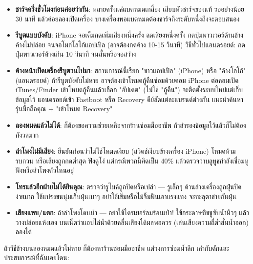 \begin{itemize}
  \item \textbf{ชาร์จครึ่งชั่วโมงก่อนค่อยว่ากัน}: หลายครั้งแค่แบตหมดเกลี้ยง เสียบหัวชาร์จของแท้ รออย่างน้อย 30 นาที แล้วค่อยลองเปิดเครื่อง บางเครื่องพอแบตหมดต้องชาร์จถึงระดับหนึ่งถึงจะตอบสนอง
  \item \textbf{รีบูตแบบบังคับ}: iPhone จอเต็มกดเพิ่มเสียงหนึ่งครั้ง ลดเสียงหนึ่งครั้ง กดปุ่มพาวเวอร์ด้านข้างค้างไม่ปล่อย จนจอโผล่โลโก้แอปเปิล (อาจต้องกดค้าง 10-15 วินาที) วิธีทั่วไปแอนดรอยด์: กดปุ่มพาวเวอร์ค้างเกิน 10 วินาที จนสั่นหรือจอสว่าง
  \item \textbf{ค้างหน้าเปิดเครื่องรีบูตวนไปมา}: สถานการณ์นี้เรียก "ขาวแอปเปิล" (iPhone) หรือ "ค้างโลโก้" (แอนดรอยด์) ถ้ารีบูตบังคับไม่หาย อาจต้องเข้าโหมดกู้คืนซ่อมด้วยคอม iPhone ต่อคอมเปิด iTunes/Finder เข้าโหมดกู้คืนแล้วเลือก "อัปเดต" (ไม่ใช่ "กู้คืน") จะติดตั้งระบบใหม่แต่เก็บข้อมูลไว้ แอนดรอยด์เข้า Fastboot หรือ Recovery คีย์ลัดแต่ละแบรนด์ต่างกัน แนะนำค้นหารุ่นมือถือคุณ + "เข้าโหมด Recovery"
  \item \textbf{ลองหมดแล้วไม่ได้}: ก็ต้องขอความช่วยเหลือจากร้านซ่อมมืออาชีพ ถ้าสำรองข้อมูลไว้แล้วก็ไม่ต้องกังวลมาก
\end{itemize}


\begin{itemize}
  \item \textbf{ลำโพงไม่มีเสียง}: ยืนยันก่อนว่าไม่ใช่โหมดเงียบ (สวิตช์เงียบข้างเครื่อง iPhone) โหมดห้ามรบกวน หรือเสียงถูกกดต่ำสุด ฟังดูโง่ แต่กรณีพวกนี้คิดเป็น 40\% แล้วตรวจว่าบลูทูธกำลังเชื่อมหูฟังหรือลำโพงตัวไหนอยู่
  \item \textbf{โทรแล้วอีกฝ่ายไม่ได้ยินคุณ}: ตรวจว่ารูไมค์ถูกปิดหรือเปล่า — รูเล็กๆ ด้านล่างเครื่องถูกฝุ่นปิดง่ายมาก ใช้แปรงขนนุ่มเก็บฝุ่นเบาๆ อย่าใช้เข็มหรือไม้จิ้มฟันเอาแรงแทง จะทะลุตาข่ายกันฝุ่น
  \item \textbf{เสียงแหบ/แตก}: ถ้าลำโพงโดนน้ำ — อย่าใช้ไดรเยอร์ลมร้อนเป่า! ใช้กระดาษทิชชูซับน้ำผิวๆ แล้ววางปล่อยแห้งเอง บนเน็ตว่าแอปไล่น้ำด้วยคลื่นเสียงได้ผลพอควร (เล่นเสียงความถี่ต่ำสั่นน้ำออก) ลองได้
\end{itemize}


ถ้าวิธีข้างบนลองหมดแล้วไม่หาย ก็ต้องหาร้านซ่อมมืออาชีพ แต่วงการซ่อมน้ำลึก เล่ากับดักและประสบการณ์ที่ฉันเคยโดน:

